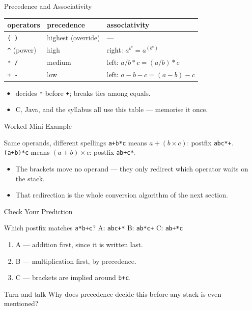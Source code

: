 \documentclass[aspectratio=169]{beamer}
\begin{document}
\begin{frame}{Precedence and Associativity}
  \begin{center}
  {\small
  \begin{tabular}{lll}
    \toprule
    \textbf{operators} & \textbf{precedence} & \textbf{associativity} \\
    \midrule
    \texttt{( )} & highest (override) & --- \\
    \texttt{\^{}} (power) & high & right: $a^{b^{c}} = a^{(b^{c})}$ \\
    \texttt{* /} & medium & left: $a/b*c = (a/b)*c$ \\
    \texttt{+ -} & low & left: $a-b-c = (a-b)-c$ \\
    \bottomrule
  \end{tabular}}
  \end{center}
  \begin{itemize}
    \item {} decides \texttt{*} before \texttt{+};
       breaks ties among equals.
    \item C, Java, and the syllabus all use this table --- memorise it once.
  \end{itemize}
\end{frame}

\begin{frame}{Worked Mini-Example}
  \begin{block}{Same operands, different spellings}
    \texttt{a+b*c} means $a + (b \times c)$: postfix \texttt{abc*+}.
    \texttt{(a+b)*c} means $(a + b) \times c$: postfix \texttt{ab+c*}.
  \end{block}
  \begin{itemize}
    \item The brackets move no operand --- they only redirect which operator
      waits on the stack.
    \item That redirection is the whole conversion algorithm of the next
      section.
  \end{itemize}
\end{frame}

\begin{frame}{Check Your Prediction}
  \begin{block}{Which postfix matches \texttt{a*b+c}?}
    A: \texttt{abc+*} \quad B: \texttt{ab*c+} \quad C: \texttt{ab+*c}
  \end{block}
  \begin{enumerate}
    \item A --- addition first, since it is written last.
    \item B --- multiplication first, by precedence.
    \item C --- brackets are implied around \texttt{b+c}.
  \end{enumerate}
  \begin{exampleblock}{Turn and talk}
    Why does precedence decide this before any stack is even mentioned?
  \end{exampleblock}
\end{frame}
\end{document}
